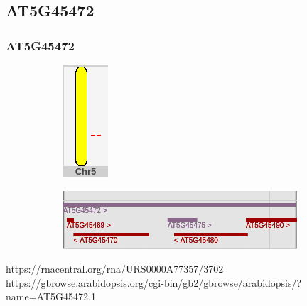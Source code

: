 \documentclass{beamer}
\begin{document}
\subsection{AT5G45472}
\begin{frame}
    \frametitle{AT5G45472}
    \begin{figure}
    \begin{subfigure}{.3\textwidth}
    \includegraphics[width=.4\linewidth]{chromosom.png}
    \end{subfigure}%
    \begin{subfigure}{.7\textwidth}
    \begin{flushleft}
    \includegraphics[scale = 0.7]{at5g45472.png}
    \end{flushleft}
    \end{subfigure}
\end{figure}

\vspace{1cm}
\scriptsize{https://rnacentral.org/rna/URS0000A77357/3702\\
https://gbrowse.arabidopsis.org/cgi-bin/gb2/gbrowse/arabidopsis/?name=AT5G45472.1}
\end{frame}
\end{document}
